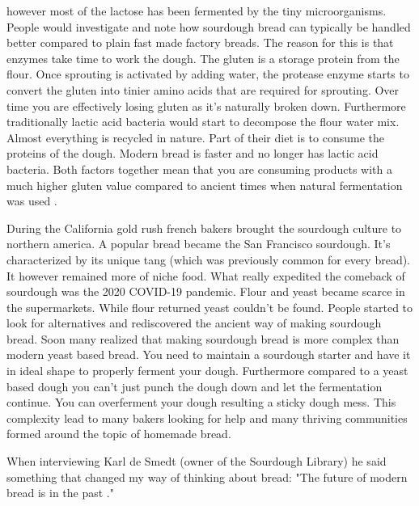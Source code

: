 however most of the lactose has been fermented by
the tiny microorganisms. People would investigate and
note how sourdough bread can typically be handled better
compared to plain fast made factory breads. The
reason for this is that enzymes take time to work the dough.
The gluten is a storage protein from the flour. Once
sprouting is activated by adding water, the protease
enzyme starts to convert the gluten into tinier amino acids
that are required for sprouting. Over time you are effectively
losing gluten as it's naturally broken down. Furthermore
traditionally lactic acid bacteria would start to decompose
the flour water mix. Almost everything is recycled in nature.
Part of their diet is to consume the proteins of the dough.
Modern bread is faster and no longer has lactic acid bacteria.
Both factors together mean that you are consuming products
with a much higher gluten value compared to ancient times
when natural fermentation was used \cite{raffaella+di+cagno}.

During the California gold rush french bakers brought the sourdough
culture to northern america. A popular bread became the
San Francisco sourdough. It's characterized by its unique
tang (which was previously common for every bread). It
however remained more of niche food. What really expedited
the comeback of sourdough was the 2020 COVID-19 pandemic.
Flour and yeast became scarce in the supermarkets. While
flour returned yeast couldn't be found. People started
to look for alternatives and rediscovered the ancient
way of making sourdough bread. Soon many realized
that making sourdough bread is more complex than modern
yeast based bread. You need to maintain a sourdough starter
and have it in ideal shape to properly ferment your dough.
Furthermore compared to a yeast based dough you can't just
punch the dough down and let the fermentation continue.
You can overferment your dough resulting a sticky
dough mess. This complexity lead to many bakers looking
for help and many thriving communities formed around
the topic of homemade bread.

When interviewing Karl de Smedt (owner of the Sourdough
Library) he said something that changed my way of thinking
about bread: "The future of
modern bread is in the past \cite{interview+karl+de+smedt}."
